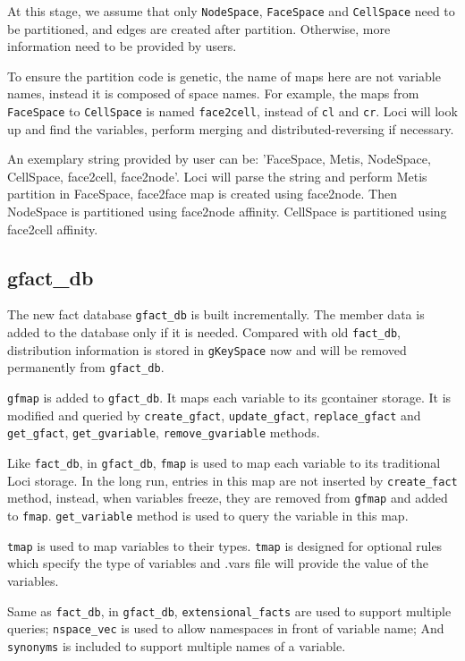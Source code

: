 \documentclass{article}
\begin{document}
At this stage, we assume that only \texttt{NodeSpace}, \texttt{FaceSpace} and \texttt{CellSpace}
need to be partitioned, and edges are created after
partition. Otherwise, more information need to be provided by users. 

To ensure the partition code is genetic, the name of maps here are not variable
names, instead it is composed of space names. For example, the maps from \texttt{FaceSpace}
to \texttt{CellSpace} is named \texttt{face2cell}, instead of \texttt{cl} and \texttt{cr}. Loci will look
up and find the variables, perform merging and distributed-reversing if necessary.

An exemplary string provided by user can be: 'FaceSpace, Metis, NodeSpace, CellSpace,
face2cell, face2node'. Loci will parse the string and perform Metis
partition in FaceSpace, face2face map is created using face2node. Then
NodeSpace is partitioned using face2node affinity. CellSpace is
partitioned using face2cell affinity. 
 
\subsection{gfact\_db}
The new fact database \texttt{gfact\_db} is built
incrementally. The member data is added to the database only if it is
needed. Compared with old \texttt{fact\_db}, distribution information
is stored in \texttt{gKeySpace} now and will be removed permanently from
\texttt{gfact\_db}.

\texttt{gfmap} is added to \texttt{gfact\_db}. It maps each variable
to its gcontainer storage. It is modified and queried by
\texttt{create\_gfact}, \texttt{update\_gfact},
\texttt{replace\_gfact} and  \texttt{get\_gfact},
\texttt{get\_gvariable}, \texttt{remove\_gvariable} methods.

Like \texttt{fact\_db},  in \texttt{gfact\_db}, \texttt{fmap} is used to map each
variable to its traditional Loci storage. In the long run, entries in this map are not inserted by \texttt{create\_fact} method,
 instead, when variables freeze, they are removed from \texttt{gfmap}
 and added to \texttt{fmap}. \texttt{get\_variable} method is
 used to query the variable in this map. 


\texttt{tmap} is used to map
variables to their types. \texttt{tmap} is designed for optional rules
which specify the type of variables and .vars file will provide the
value of the variables.

Same as \texttt{fact\_db}, in \texttt{gfact\_db},  \texttt{extensional\_facts} are used to support multiple
queries;   \texttt{nspace\_vec} is used to allow namespaces in front of
variable name; And \texttt{synonyms} is included to support multiple
names of a variable.
\end{document}
